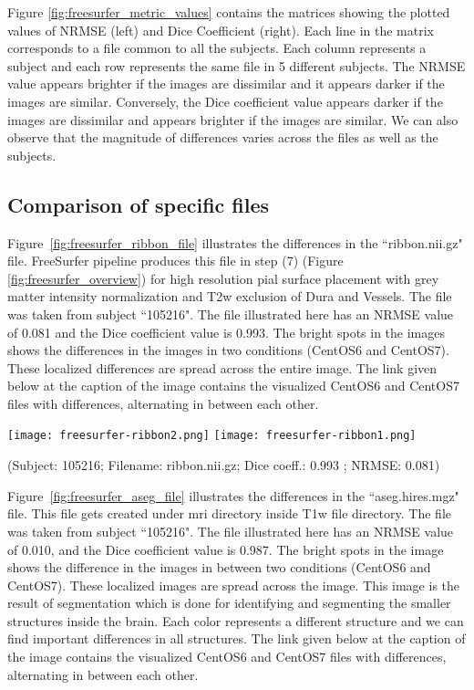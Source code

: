 Figure \ref{fig:freesurfer_metric_values} contains the matrices showing the plotted values of NRMSE (left) and Dice Coefficient (right). Each line in the matrix corresponds to a file common to all the subjects. Each column represents a subject and each row represents the same file in 5 different subjects. The NRMSE value appears brighter if the images are dissimilar and it appears darker if the images are similar. Conversely, the Dice coefficient value appears darker if the images are dissimilar and appears brighter if the images are similar. We can also observe that the magnitude of differences varies across the files as well as the subjects.

\subsection{Comparison of specific files}
Figure~\ref{fig:freesurfer_ribbon_file} illustrates the differences in the ``ribbon.nii.gz" file. FreeSurfer pipeline produces this file in step (7) (Figure \ref{fig:freesurfer_overview}) for high resolution pial surface placement with grey matter intensity normalization and T2w exclusion of Dura and Vessels.
The file was taken from subject ``105216". The file illustrated here has an NRMSE value of 0.081 and the Dice coefficient value is 0.993. The bright spots in the images shows the differences in the images in two conditions (CentOS6 and CentOS7). These localized differences are spread across the entire image.
The link given below at the caption of the image contains the visualized CentOS6 and CentOS7 files with differences, alternating in between each other.

\begin{center}
\texttt{[image: freesurfer-ribbon2.png]}%
\texttt{[image: freesurfer-ribbon1.png]}
\caption*{(Subject: 105216; Filename: ribbon.nii.gz; Dice coeff.: 0.993 ; NRMSE: 0.081)}
\label{fig:freesurfer_ribbon_file}
\end{center}

Figure~\ref{fig:freesurfer_aseg_file} illustrates the differences in the ``aseg.hires.mgz" file. This file gets created under mri directory inside T1w file directory. The file was taken from subject ``105216". The file illustrated here has an NRMSE value of 0.010, and the Dice coefficient value is 0.987. The bright spots in the image shows the difference in the images in between two conditions (CentOS6 and CentOS7). These localized images are spread across the image. This image is the result of segmentation which is done for identifying and segmenting the smaller structures inside the brain. Each color represents a different structure and we can find important differences in all structures. The link given below at the caption of the image contains the visualized CentOS6 and CentOS7 files with differences, alternating in between each other.

